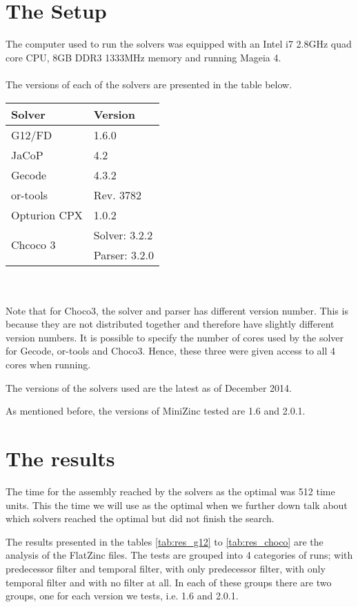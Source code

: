 \section{The Setup}
The computer used to run the solvers was equipped with an Intel i7 2.8GHz quad core CPU, 8GB DDR3 1333MHz memory and running Mageia 4.
\\\\
The versions of each of the solvers are presented in the table below.
\begin{table}[h]
\centering
\begin{tabular}{l|l}
Solver                    & Version \\ \hline
G12/FD                    & 1.6.0\\
JaCoP                     & 4.2 \\
Gecode                    & 4.3.2 \\
or-tools                  & Rev. 3782 \\
Opturion CPX              & 1.0.2 \\
\multirow{2}{*}{Chcoco 3} & Solver: 3.2.2 \\
                          & Parser: 3.2.0
\end{tabular}
\end{table}\\\\
Note that for Choco3, the solver and parser has different version number. This is because they are not distributed together and therefore have slightly different version numbers. It is possible to specify the number of cores used by the solver for Gecode, or-tools and Choco3. Hence, these three were given access to all 4 cores when running.

The versions of the solvers used are the latest as of December 2014.

As mentioned before, the versions of MiniZinc tested are 1.6 and 2.0.1.

\section{The results}\label{sec:res}
The time for the assembly reached by the solvers as the optimal was 512 time units. This the time we will use as the optimal when we further down talk about which solvers reached the optimal but did not finish the search.

The results presented in the tables \ref{tab:res_g12} to \ref{tab:res_choco} are the analysis of the FlatZinc files. The tests are grouped into 4 categories of runs; with predecessor filter and temporal filter, with only predecessor filter, with only temporal filter and with no filter at all. In each of these groups there are two groups, one for each version we tests, i.e. 1.6 and 2.0.1.

